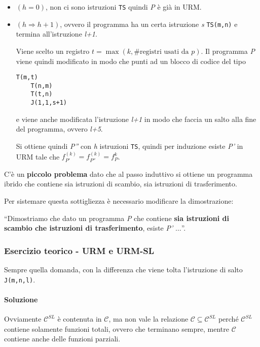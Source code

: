 \begin{itemize}
	\item $(h=0)$, non ci sono istruzioni \texttt{TS} quindi \textit{P} è già in URM.
	
	\item $(h \Rightarrow h+1)$, ovvero il programma ha un certa istruzione \textit{s} \texttt{TS(m,n)} e termina all'istruzione \textit{l+1}.
	
	Viene scelto un registro $t = \max(k, \text{\#registri usati da }p)$. Il
	programma \textit{P} viene quindi modificato in modo che punti ad un blocco di
	codice del tipo
	
	\begin{lstlisting}[language=URM]
	T(m,t)
	T(n,m)
	T(t,n)
	J(1,1,s+1)\end{lstlisting}
	
	e viene anche modificata l'istruzione \textit{l+1} in modo che faccia un salto
	alla fine del programma, ovvero \textit{l+5}.
	
	Si ottiene quindi \textit{P''} con \textit{h} istruzioni \texttt{TS}, quindi per induzione esiste \textit{P'} in URM tale che $f_{P'}^{(k)} = f_{P''}^{(k)} = f_P^k$.
\end{itemize}

C'è un \textbf{piccolo problema} dato che al passo induttivo si ottiene un programma ibrido che contiene sia istruzioni di scambio, sia istruzioni di trasferimento.

Per sistemare questa sottigliezza è necessario modificare la dimostrazione:

``Dimostriamo che dato un programma \textit{P} che contiene \textbf{sia istruzioni di
scambio che istruzioni di trasferimento}, esiste \textit{P'} $\ldots$''.


\subsubsection{Esercizio teorico - URM e URM-SL}\label{esercizione-teorico---urm-e-urm-sl}

Sempre quella domanda, con la differenza che viene tolta l'istruzione di salto \texttt{J(m,n,l)}.

\paragraph{Soluzione}

Ovviamente $\mathcal{C}^{SL}$ è contenuta in $\mathcal{C}$, ma non vale la relazione $\mathcal{C} \subseteq \mathcal{C}^{SL}$ perché $\mathcal{C}^{SL}$ contiene solamente funzioni totali, ovvero che terminano sempre, mentre $\mathcal{C}$ contiene anche delle funzioni parziali.

